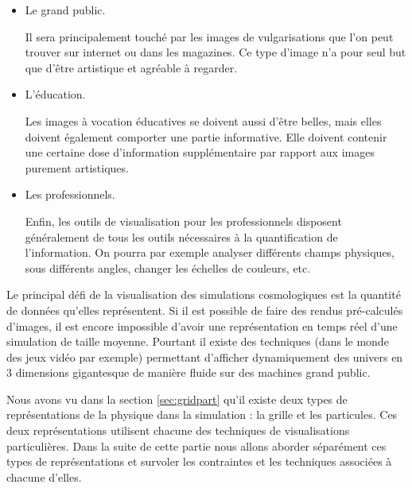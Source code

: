 \begin{itemize}
\item Le grand public. 
 
Il sera principalement touché par les images de vulgarisations que l'on peut trouver sur internet ou dans les magazines.
Ce type d'image n'a pour seul but que d'être artistique et agréable à regarder.

\item L'éducation.

Les images à vocation éducatives se doivent aussi d'être belles, mais elles doivent également comporter une partie informative.
Elle doivent contenir une certaine dose d'information supplémentaire par rapport aux images purement artistiques.

\item Les professionnels.

Enfin, les outils de visualisation pour les professionnels disposent généralement de tous les outils nécessaires à la quantification de l'information.
On pourra par exemple analyser différents champs physiques, sous différents angles, changer les échelles de couleurs, etc.
\end{itemize}





Le principal défi de la visualisation des simulations cosmologiques est la quantité de données qu'elles représentent.
Si il est possible de faire des rendus pré-calculés d'images, il est encore impossible d'avoir une représentation en temps réel d'une simulation de taille moyenne.
Pourtant il existe des techniques (dans le monde des jeux vidéo par exemple) permettant d'afficher dynamiquement des univers en 3 dimensions gigantesque de manière fluide sur des machines grand public.

Nous avons vu dans la section \ref{sec:gridpart} qu'il existe deux types de représentations de la physique dans la simulation : la grille et les particules.
Ces deux représentations utilisent chacune des techniques de visualisations particulières.
Dans la suite de cette partie nous allons aborder séparément ces types de représentations et survoler les contraintes et les techniques associées à chacune d'elles.

